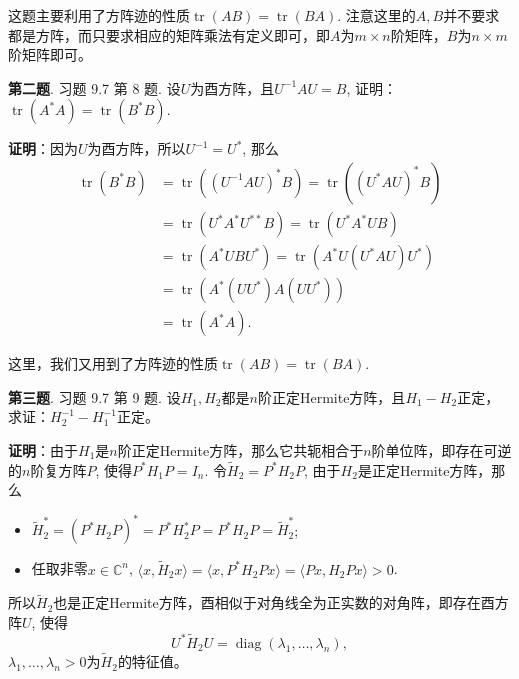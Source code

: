 \vspace{1em}

这题主要利用了方阵迹的性质$\operatorname{tr}(AB) = \operatorname{tr}(BA)$. 注意这里的$A, B$并不要求都是方阵，而只要求相应的矩阵乘法有定义即可，即$A$为$m\times n$阶矩阵，$B$为$n\times m$阶矩阵即可。


\newpageorvspace


{\bf 第二题}. 习题 9.7 第 8 题. 设$U$为酉方阵，且$U^{-1}AU = B$, 证明：$\operatorname{tr} \left( A^* A \right) = \operatorname{tr} \left( B^* B \right).$

\newpageorvspace

{\bf 证明}：因为$U$为酉方阵，所以$U^{-1} = U^*$, 那么
\begin{align*}
\operatorname{tr} \left( B^* B \right) & = \operatorname{tr} \left( \left( U^{-1} A U \right)^* B \right) = \operatorname{tr} \left( \left( U^* A U \right)^* B \right) \\
& = \operatorname{tr} \left( U^* A^* U^{**} B \right) = \operatorname{tr} \left( U^* A^* U B \right) \\
& = \operatorname{tr} \left( A^* U B U^* \right) = \operatorname{tr} \left( A^* U \left( U^* A U \right) U^* \right) \\
& = \operatorname{tr} \left( A^* \left( U U^* \right) A \left( U U^* \right) \right) \\
& = \operatorname{tr} \left( A^* A \right).
\end{align*}

这里，我们又用到了方阵迹的性质$\operatorname{tr}(AB) = \operatorname{tr}(BA)$.


\newpageorvspace


{\bf 第三题}. 习题 9.7 第 9 题. 设$H_1, H_2$都是$n$阶正定Hermite方阵，且$H_1 - H_2$正定，求证：$H_2^{-1} - H_1^{-1}$正定。

\newpageorvspace

{\bf 证明}：由于$H_1$是$n$阶正定Hermite方阵，那么它共轭相合于$n$阶单位阵，即存在可逆的$n$阶复方阵$P$, 使得$P^* H_1 P = I_n$. 令$\widetilde{H}_2 = P^* H_2 P$, 由于$H_2$是正定Hermite方阵，那么
\begin{itemize}
\item $\widetilde{H}_2^* = \left( P^* H_2 P \right)^* = P^* H_2^* P = P^* H_2 P = \widetilde{H}_2^*$;
\item 任取非零$x \in \mathbb{C}^n$, $\langle x, \widetilde{H}_2 x \rangle = \langle x, P^* H_2 P x \rangle = \langle Px, H_2 P x \rangle > 0$.
\end{itemize}
所以$\widetilde{H}_2$也是正定Hermite方阵，酉相似于对角线全为正实数的对角阵，即存在酉方阵$U$, 使得
$$U^* \widetilde{H}_2 U = \operatorname{diag} (\lambda_1, \ldots, \lambda_n),$$
$\lambda_1, \ldots, \lambda_n > 0$为$\widetilde{H}_2$的特征值。

